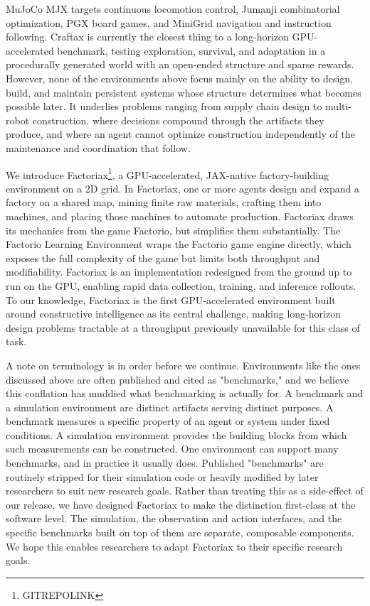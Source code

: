 \documentclass{article}
\begin{document}
MuJoCo MJX targets continuous locomotion control, Jumanji combinatorial optimization, PGX board games, and MiniGrid navigation and instruction following.
Craftax is currently the closest thing to a long-horizon GPU-accelerated benchmark, testing exploration, survival, and adaptation in a procedurally generated world with an open-ended structure and sparse rewards. 
However, none of the environments above focus mainly on the ability to design, build, and maintain persistent systems whose structure determines what becomes possible later. 
It underlies problems ranging from supply chain design to multi-robot construction, where decisions compound through the artifacts they produce, and where an agent cannot optimize construction independently of the maintenance and coordination that follow.

We introduce Factoriax\footnote{GITREPOLINK}, a GPU-accelerated, JAX-native factory-building environment on a 2D grid.
In Factoriax, one or more agents design and expand a factory on a shared map, mining finite raw materials, crafting them into machines, and placing those machines to automate production. 
Factoriax draws its mechanics from the game Factorio, but simplifies them substantially.
The Factorio Learning Environment wraps the Factorio game engine directly, which exposes the full complexity of the game but limits both throughput and modifiability.
Factoriax is an implementation redesigned from the ground up to run on the GPU, enabling rapid data collection, training, and inference rollouts. 
To our knowledge, Factoriax is the first GPU-accelerated environment built around constructive intelligence as its central challenge, making long-horizon design problems tractable at a throughput previously unavailable for this class of task.

A note on terminology is in order before we continue. 
Environments like the ones discussed above are often published and cited as "benchmarks," and we believe this conflation has muddied what benchmarking is actually for. 
A benchmark and a simulation environment are distinct artifacts serving distinct purposes. 
A benchmark measures a specific property of an agent or system under fixed conditions. 
A simulation environment provides the building blocks from which such measurements can be constructed.
One environment can support many benchmarks, and in practice it usually does. Published "benchmarks" are routinely stripped for their simulation code or heavily modified by later researchers to suit new research goals. 
Rather than treating this as a side-effect of our release, we have designed Factoriax to make the distinction first-class at the software level. 
The simulation, the observation and action interfaces, and the specific benchmarks built on top of them are separate, composable components. 
We hope this enables researchers to adapt Factoriax to their specific research goals.
\end{document}
